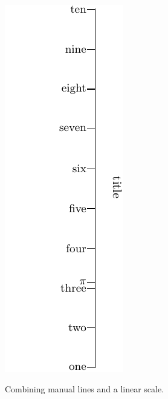 \documentclass[a4paper,11pt,english]{sphinxmanual}
\begin{document}
\includegraphics{ex_axes_6.pdf}

Combining manual lines and  a linear scale.
\end{document}
